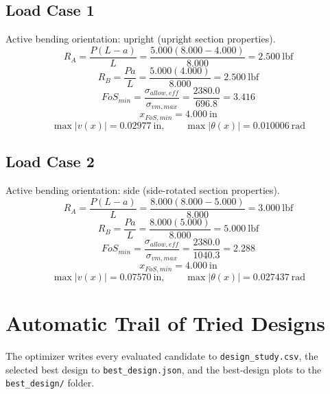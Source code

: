 \documentclass[11pt]{article}
\begin{document}
\subsection*{Load Case 1}
Active bending orientation: upright (upright section properties).
\[R_A = \frac{P(L-a)}{L} = \frac{5.000(8.000-4.000)}{8.000} = 2.500\ \mathrm{lbf}\]
\[R_B = \frac{Pa}{L} = \frac{5.000(4.000)}{8.000} = 2.500\ \mathrm{lbf}\]
\[FoS_{min} = \frac{\sigma_{allow,eff}}{\sigma_{vm,max}} = \frac{2380.0}{696.8} = 3.416\]
\[x_{FoS,min} = 4.000\ \mathrm{in}\]
\[\max |v(x)| = 0.02977\ \mathrm{in}, \qquad \max |\theta(x)| = 0.010006\ \mathrm{rad}\]
\subsection*{Load Case 2}
Active bending orientation: side (side-rotated section properties).
\[R_A = \frac{P(L-a)}{L} = \frac{8.000(8.000-5.000)}{8.000} = 3.000\ \mathrm{lbf}\]
\[R_B = \frac{Pa}{L} = \frac{8.000(5.000)}{8.000} = 5.000\ \mathrm{lbf}\]
\[FoS_{min} = \frac{\sigma_{allow,eff}}{\sigma_{vm,max}} = \frac{2380.0}{1040.3} = 2.288\]
\[x_{FoS,min} = 4.000\ \mathrm{in}\]
\[\max |v(x)| = 0.07570\ \mathrm{in}, \qquad \max |\theta(x)| = 0.027437\ \mathrm{rad}\]

\section*{Automatic Trail of Tried Designs}
The optimizer writes every evaluated candidate to \texttt{design\_study.csv}, the selected best design to \texttt{best\_design.json}, and the best-design plots to the \texttt{best\_design/} folder.
\end{document}
